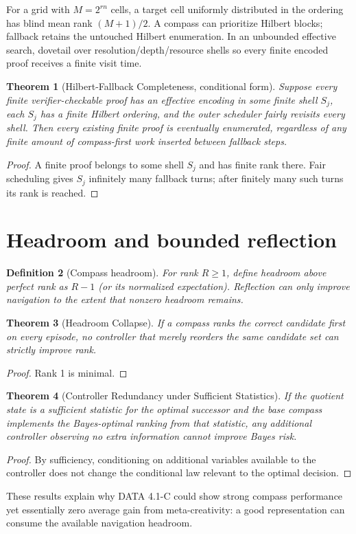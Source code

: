 \documentclass[11pt]{article}
\newtheorem{theorem}{Theorem}[section]\newtheorem{corollary}[theorem]{Corollary}\newtheorem{proposition}[theorem]{Proposition}\newtheorem{conjecture}[theorem]{Conjecture}\newtheorem{definition}[theorem]{Definition}\newtheorem{remark}[theorem]{Remark}
\begin{document}
For a grid with $M=2^{rn}$ cells, a target cell uniformly distributed in the ordering has blind mean rank $(M+1)/2$. A compass can prioritize Hilbert blocks; fallback retains the untouched Hilbert enumeration. In an unbounded effective search, dovetail over resolution/depth/resource shells so every finite encoded proof receives a finite visit time.
\begin{theorem}[Hilbert-Fallback Completeness, conditional form]Suppose every finite verifier-checkable proof has an effective encoding in some finite shell $S_j$, each $S_j$ has a finite Hilbert ordering, and the outer scheduler fairly revisits every shell. Then every existing finite proof is eventually enumerated, regardless of any finite amount of compass-first work inserted between fallback steps.\end{theorem}
\begin{proof}A finite proof belongs to some shell $S_j$ and has finite rank there. Fair scheduling gives $S_j$ infinitely many fallback turns; after finitely many such turns its rank is reached.\end{proof}
\section{Headroom and bounded reflection}
\begin{definition}[Compass headroom]For rank $R\ge1$, define headroom above perfect rank as $R-1$ (or its normalized expectation). Reflection can only improve navigation to the extent that nonzero headroom remains.\end{definition}
\begin{theorem}[Headroom Collapse]If a compass ranks the correct candidate first on every episode, no controller that merely reorders the same candidate set can strictly improve rank.\end{theorem}
\begin{proof}Rank 1 is minimal.\end{proof}
\begin{theorem}[Controller Redundancy under Sufficient Statistics]If the quotient state is a sufficient statistic for the optimal successor and the base compass implements the Bayes-optimal ranking from that statistic, any additional controller observing no extra information cannot improve Bayes risk.\end{theorem}
\begin{proof}By sufficiency, conditioning on additional variables available to the controller does not change the conditional law relevant to the optimal decision.\end{proof}
These results explain why DATA 4.1-C could show strong compass performance yet essentially zero average gain from meta-creativity: a good representation can consume the available navigation headroom.
\end{document}
